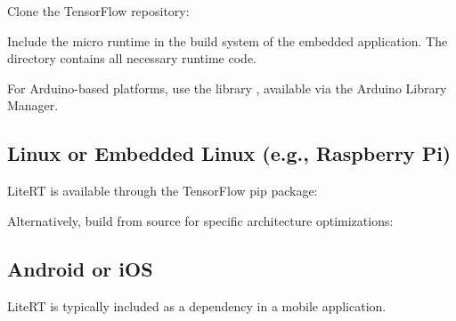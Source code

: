 Clone the TensorFlow repository:

\medskip



\medskip


Include the micro runtime in the build system of the embedded application. The directory   contains all necessary runtime code.



\bigskip



For Arduino-based platforms, use the library  , available via the Arduino Library Manager.



\subsection{Linux or Embedded Linux (e.g., Raspberry Pi)}



LiteRT is available through the TensorFlow pip package:

\medskip



\medskip



Alternatively, build from source for specific architecture optimizations:

\medskip

{
  
  \medskip




}



\subsection{Android or iOS}



LiteRT is typically included as a dependency in a mobile application.




